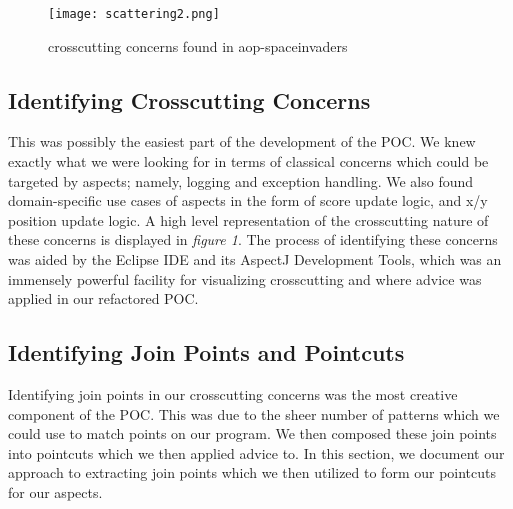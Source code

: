 \documentclass[sigconf]{acmart}
\begin{document}
 \begin{figure}
    \centering
    \texttt{[image: scattering2.png]}
    \caption{crosscutting concerns found in aop-spaceinvaders}
    \label{fig:1}
\end{figure}

\subsection{Identifying Crosscutting Concerns}
This was possibly the easiest part of the development of the POC. We knew exactly what we were looking for in terms of classical concerns which could be targeted by aspects; namely, logging and exception handling. We also found domain-specific use cases of aspects in the form of score update logic, and x/y position update logic. A high level representation of the crosscutting nature of these concerns is displayed in \textit{figure 1}. The process of identifying these concerns was aided by the Eclipse IDE and its AspectJ Development Tools, which was an immensely powerful facility for visualizing crosscutting and where advice was applied in our refactored POC.

\subsection{Identifying Join Points and Pointcuts}
Identifying join points in our crosscutting concerns was the most creative component of the POC. This was due to the sheer number of patterns which we could use to match points on our program. We then composed these join points into pointcuts which we then applied advice to. In this section, we document our approach to extracting join points which we then utilized to form our pointcuts for our aspects.
\end{document}
